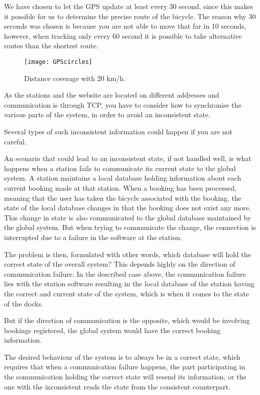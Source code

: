 \begin{description}[style=nextline]
We have chosen to let the GPS update at least every 30 second, since this makes it possible for us to determine the precise route of the bicycle.
The reason why 30 seconds was chosen is because you are not able to move that far in 10 seconds, however, when tracking only every 60 second it is possible to take alternative routes than the shortest route.


\begin{figure}
	\centering
	\texttt{[image: GPScircles]}
	\caption{Distance coverage with 20 km/h.}
	\label{fig:gpsCircles}
\end{figure}

\item[Problem 1.4]
As the stations and the website are located on different addresses and communication is through TCP, you have to consider how to synchronise the various parts of the system, in order to avoid an inconsistent state.

Several types of such inconsistent information could happen if you are not careful.

An scenario that could lead to an inconsistent state, if not handled well, is what happens when a station fails to communicate its current state to the global system.
A station maintains a local database holding information about each current booking made at that station.
When a booking has been processed, meaning that the user has taken the bicycle associated with the booking, the state of the local database changes in that the booking does not exist any more.
This change in state is also communicated to the global database maintained by the global system.
But when trying to communicate the change, the connection is interrupted due to a failure in the software at the station.

The problem is then, formulated with other words, which database will hold the correct state of the overall system?
This depends highly on the direction of communication failure. 
In the described case above, the communication failure lies with the station software resulting in the local database of the station having the correct and current state of the system, which is when it comes to the state of the docks.


But if the direction of communication is the opposite, which would be involving bookings registered, the global system would have the correct booking information.

The desired behaviour of the system is to always be in a correct state, which requires that when a communication failure happens, the part participating in the communication holding the correct state will resend its information, or the one with the inconsistent reads the state from the consistent counterpart.


\end{description}
